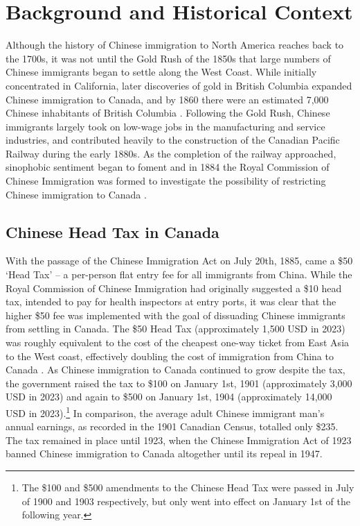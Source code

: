 \section{Background and Historical Context}
Although the history of Chinese immigration to North America reaches back to the 1700s, it was not until the Gold Rush of the 1850s that large numbers of Chinese immigrants began to settle along the West Coast. 
While initially concentrated in California, later discoveries of gold in British Columbia expanded Chinese immigration to Canada, and by 1860 there were an estimated 7,000 Chinese inhabitants of British Columbia \citep{chan2019}.
Following the Gold Rush, Chinese immigrants largely took on low-wage jobs in the manufacturing and service industries, and contributed heavily to the construction of the Canadian Pacific Railway during the early 1880s.
As the completion of the railway approached, sinophobic sentiment began to foment and in 1884 the Royal Commission of Chinese Immigration was formed to investigate the possibility of restricting Chinese immigration to Canada \citep{chan2016}.

\subsection{Chinese Head Tax in Canada}
With the passage of the Chinese Immigration Act on July 20th, 1885, came a \$50 `Head Tax' -- a per-person flat entry fee for all immigrants from China. While the Royal Commission of Chinese Immigration had originally suggested a \$10 head tax, intended to pay for health inspectors at entry ports, it was clear that the higher \$50 fee was implemented with the goal of dissuading Chinese immigrants from settling in Canada. 
The \$50 Head Tax (approximately 1,500 USD in 2023) was roughly equivalent to the cost of the cheapest one-way ticket from East Asia to the West coast, effectively doubling the cost of immigration from China to Canada \citep{boatcost}. As Chinese immigration to Canada continued to grow despite the tax, the government raised the tax to \$100 on January 1st, 1901 (approximately 3,000 USD in 2023) and again to \$500 on January 1st, 1904 (approximately 14,000 USD in 2023).\footnote{The \$100 and \$500 amendments to the Chinese Head Tax were passed in July of 1900 and 1903 respectively, but only went into effect on January 1st of the following year.} In comparison, the average adult Chinese immigrant man's annual earnings, as recorded in the 1901 Canadian Census, totalled only \$235. The tax remained in place until 1923, when the Chinese Immigration Act of 1923 banned Chinese immigration to Canada altogether until its repeal in 1947.

